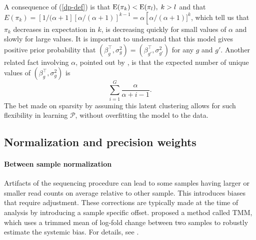A consequence of (\ref{dp-def}) is that $\operatorname{E}(\pi_k)<\operatorname{E}(\pi_l),\;k>l$ and that $E(\pi_k)=\left[1/(\alpha+1\right]\left[\alpha/(\alpha+1)\right]^{k-1} = \alpha \left[\alpha/(\alpha+1)]^{k}$, which tell us that $\pi_k$ decreases in expectation in $k$, is decreasing quickly for small values of $\alpha$ and slowly for large values. It is important to understand that this model gives positive prior probability that $(\beta_g^\top,\sigma_g^2)=(\beta_{g'}^\top,\sigma_{g'}^2)$ for any $g$ and $g'$. Another related fact involving $\alpha$, pointed out by \citet[p. 1161]{antoniak}, is that the expected number of unique values of $(\beta_g^\top,\sigma^2_g)$ is 
\begin{equation}
\label{exp-num-clust}
\sum_{i=1}^G \frac{\alpha}{\alpha + i - 1}.
\end{equation}  The bet made on sparsity by assuming this latent clustering allows for such flexibility in learning $\mathcal{P}$, without overfitting the model to the data.


%
%
%

\subsection{Normalization and precision weights}
\label{norm-weight}
\paragraph{Between sample normalization}
Artifacts of the sequencing procedure can lead to some samples having larger or smaller read counts on average relative to other sample. This introduces biases that require adjustment. These corrections are typically made at the time of analysis by introducing a sample specific offset. \citet{robinson2010} proposed a method called TMM, which uses a trimmed mean of log-fold change between two samples to robustly estimate the systemic bias. For details, see \citet{robinson2010}.

